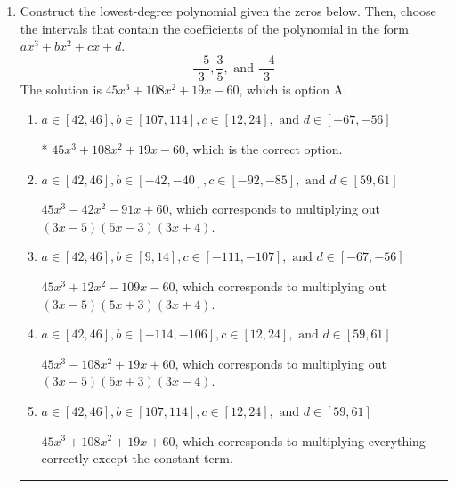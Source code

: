 \documentclass{extbook}[14pt]
\newcommand{\litem}[1]{\item #1

\rule{\textwidth}{0.4pt}}
\begin{document}
\begin{enumerate}\litem{
Construct the lowest-degree polynomial given the zeros below. Then, choose the intervals that contain the coefficients of the polynomial in the form $ax^3+bx^2+cx+d$.
\[ \frac{-5}{3}, \frac{3}{5}, \text{ and } \frac{-4}{3} \]The solution is \( 45x^{3} +108 x^{2} +19 x -60 \), which is option A.\begin{enumerate}[label=\Alph*.]
\item \( a \in [42, 46], b \in [107, 114], c \in [12, 24], \text{ and } d \in [-67, -56] \)

* $45x^{3} +108 x^{2} +19 x -60$, which is the correct option.
\item \( a \in [42, 46], b \in [-42, -40], c \in [-92, -85], \text{ and } d \in [59, 61] \)

$45x^{3} -42 x^{2} -91 x + 60$, which corresponds to multiplying out $(3x -5)(5x -3)(3x + 4)$.
\item \( a \in [42, 46], b \in [9, 14], c \in [-111, -107], \text{ and } d \in [-67, -56] \)

$45x^{3} +12 x^{2} -109 x -60$, which corresponds to multiplying out $(3x -5)(5x + 3)(3x + 4)$.
\item \( a \in [42, 46], b \in [-114, -106], c \in [12, 24], \text{ and } d \in [59, 61] \)

$45x^{3} -108 x^{2} +19 x + 60$, which corresponds to multiplying out $(3x -5)(5x + 3)(3x -4)$.
\item \( a \in [42, 46], b \in [107, 114], c \in [12, 24], \text{ and } d \in [59, 61] \)

$45x^{3} +108 x^{2} +19 x + 60$, which corresponds to multiplying everything correctly except the constant term.
\end{enumerate}

}
\end{enumerate}
\end{document}
